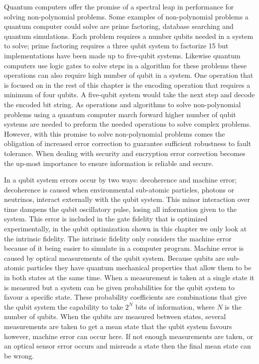
Quantum computers offer the promise of a spectral leap in performance for solving non-polynomial problems. Some examples of non-polynomial problems a quantum computer could solve are prime factoring, database searching and quantum simulations. Each problem requires a number qubits needed in a system to solve; prime factoring requires a three qubit system to factorize 15 but implementations have been made up to five-qubit systems\cite{Lucero}. Likewise quantum computers use logic gates to
solve steps in a
algorithm for these problems these operations can also require high number of qubit in a system. One operation that is focused on in the rest of this chapter is the encoding operation that requires a minimum of four qubits. A five-qubit system would take the next step and decode the encoded bit string. As operations and algorithms to solve non-polynomial problems using a quantum computer march forward higher number of qubit systems are needed to preform the needed operations to solve complex problems. However, with
this promise to solve non-polynomial problems comes the obligation of increased error correction to guarantee sufficient robustness to fault tolerance. When dealing with security and encryption error correction becomes the up-most importance to ensure information is reliable and secure.

In a qubit system errors occur by two ways: decoherence and machine error; decoherence is caused when environmental sub-atomic particles, photons or neutrinos, interact externally with the qubit system. This minor interaction over time dampens the qubit oscillatory pulse, losing all information given to the system. This error is included in the gate fidelity that is optimized experimentally, in the qubit optimization shown in this chapter we only look at the intrinsic fidelity. The intrinsic
fidelity only considers the
machine error because of it being easier to simulate in a computer program. Machine error is caused by optical measurements of the qubit system. Because qubits are sub-atomic particles they have quantum mechanical properties that allow them to be in both states at the same time. When a measurement is taken at a single state it is measured but a system can be given probabilities for the qubit system to favour a specific state. These probability coefficients are combinations that give the
qubit system the capability to take $2^N$ bits of information, where $N$ is the number of qubits. When the qubits are measured between states, several measurements are taken to get a mean state that the qubit system favours however, machine error can occur here. If not enough measurements are taken, or an optical sensor error occurs and misreads a state then the final mean state can be wrong. 

